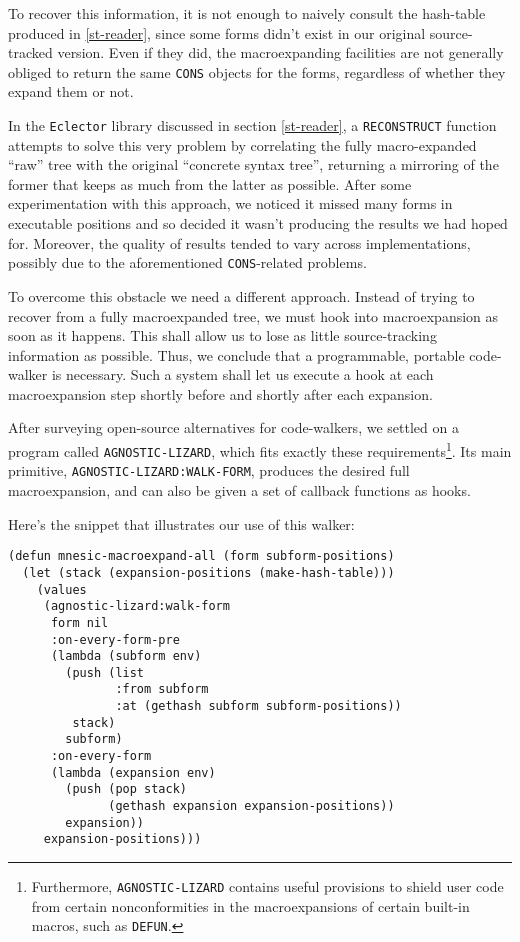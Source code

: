 \documentclass[sigconf]{acmart}
\begin{document}
To recover this information, it is not enough to naively consult the
hash-table produced in \ref{st-reader}, since some forms didn't exist
in our original source-tracked version.  Even if they did, the
macroexpanding facilities are not generally obliged to return the same
\texttt{CONS} objects for the forms, regardless of whether they expand
them or not.

In the \texttt{Eclector} library discussed in section \ref{st-reader},
a \texttt{RECONSTRUCT} function attempts to solve this very problem by
correlating the fully macro-expanded ``raw'' tree with the original
``concrete syntax tree'', returning a mirroring of the former that
keeps as much from the latter as possible.  After some experimentation
with this approach, we noticed it missed many forms in executable
positions and so decided it wasn't producing the results we had hoped
for.  Moreover, the quality of results tended to vary across
implementations, possibly due to the aforementioned
\texttt{CONS}-related problems.

To overcome this obstacle we need a different approach.  Instead of
trying to recover from a fully macroexpanded tree, we must hook into
macroexpansion as soon as it happens.  This shall allow us to lose as
little source-tracking information as possible.  Thus, we conclude
that a programmable, portable code-walker is necessary.  Such a system
shall let us execute a hook at each macroexpansion step shortly before
and shortly after each expansion.

After surveying open-source alternatives for code-walkers, we settled
on a program called \texttt{AGNOSTIC-LIZARD}\cite{agnostic-lizard},
which fits exactly these requirements\footnote{Furthermore,
  \texttt{AGNOSTIC-LIZARD} contains useful provisions to shield user
  code from certain nonconformities in the macroexpansions of certain
  built-in macros, such as \texttt{DEFUN}.}.  Its main primitive,
\texttt{AGNOSTIC-LIZARD:WALK-FORM}, produces the desired full
macroexpansion, and can also be given a set of callback functions as
hooks.

Here's the snippet that illustrates our use of this walker:

\begin{verbatim}
(defun mnesic-macroexpand-all (form subform-positions)
  (let (stack (expansion-positions (make-hash-table)))
    (values
     (agnostic-lizard:walk-form
      form nil
      :on-every-form-pre
      (lambda (subform env)
        (push (list
               :from subform
               :at (gethash subform subform-positions))
         stack)
        subform)
      :on-every-form
      (lambda (expansion env)
        (push (pop stack)
              (gethash expansion expansion-positions))
        expansion))
     expansion-positions)))
\end{verbatim}
\end{document}
